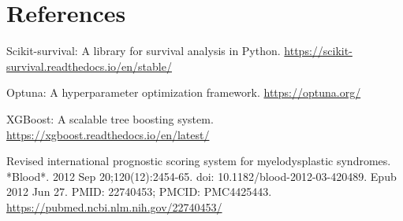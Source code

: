 \documentclass{article}
\begin{document}
\section{References}
\begin{thebibliography}{9}
    Scikit-survival: A library for survival analysis in Python.
    \url{https://scikit-survival.readthedocs.io/en/stable/}
    
    Optuna: A hyperparameter optimization framework.
    \url{https://optuna.org/}

    XGBoost: A scalable tree boosting system.
    \url{https://xgboost.readthedocs.io/en/latest/}

    Revised international prognostic scoring system for myelodysplastic syndromes. *Blood*. 2012 Sep 20;120(12):2454-65. doi: 10.1182/blood-2012-03-420489. Epub 2012 Jun 27. PMID: 22740453; PMCID: PMC4425443.
    \url{https://pubmed.ncbi.nlm.nih.gov/22740453/}
\end{thebibliography}
\end{document}
